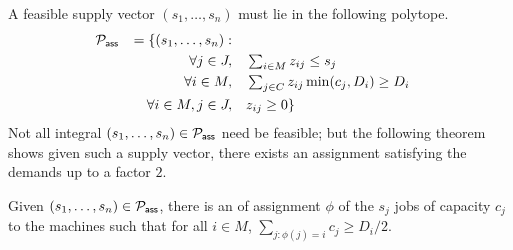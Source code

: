 \noindent
A feasible supply vector $(s_1,\ldots,s_n)$ must lie in the following polytope.
	\begin{alignat}{4}
		{\cal P}_\mathsf{ass} && = \{(s_1,\ldots,s_n):  && \notag \\
		&& \quad \forall j \in J,   &\quad  \textstyle \sum_{i\in M} z_{ij}  \leq  s_j \label{eq:asslp1} \\
		&& \quad \forall i\in M ,  &\quad  \textstyle \sum_{j\in C}  z_{ij}  \min(c_j,D_i) \geq D_i \label{eq:asslp2} \\
		&& \quad \forall i\in M, j\in J, & \quad z_{ij}   \geq 0 \label{eq:asslp3}  \}
	\end{alignat}
Not all integral $(s_1,\ldots,s_n) \in {\cal P}_\mathsf{ass}$ need be feasible; but the following theorem shows given such a supply vector, there exists an assignment satisfying the demands up to a factor $2$.
\begin{theorem}\label{thm:asslprounding}
Given $(s_1,\ldots,s_n) \in {\cal P}_\mathsf{ass}$, there is an of assignment $\phi$ of the $s_j$ jobs of capacity $c_j$  to the machines such that for all $i\in M$, 
$\sum_{j:\phi(j) = i} c_j \geq D_i/2$.
\end{theorem}

